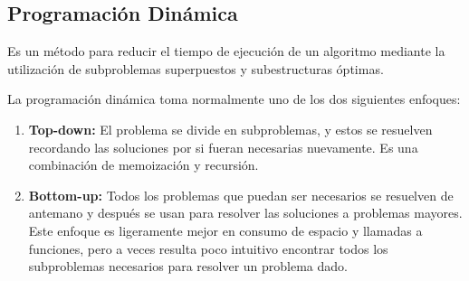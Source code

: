 \subsection{Programación Dinámica}
Es un método para reducir el tiempo de ejecución de un algoritmo mediante la utilización de subproblemas superpuestos y subestructuras óptimas. 

La programación dinámica toma normalmente uno de los dos siguientes enfoques:

\begin{enumerate}
	\item \textbf{Top-down:} El problema se divide en subproblemas, y estos se resuelven recordando las soluciones por si fueran necesarias nuevamente. Es una combinación de memoización y recursión.
	\item \textbf{Bottom-up:} Todos los problemas que puedan ser necesarios se resuelven de antemano y después se usan para resolver las soluciones a problemas mayores. Este enfoque es ligeramente mejor en consumo de espacio y llamadas a funciones, pero a veces resulta poco intuitivo encontrar todos los subproblemas necesarios para resolver un problema dado.
\end{enumerate}




